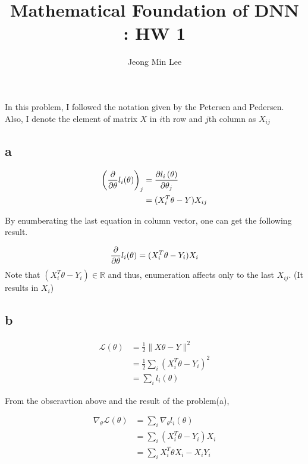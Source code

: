 \documentclass[10pt]{article}
\title{\textbf{Mathematical Foundation of DNN : HW 1}}
\author{Jeong Min Lee}
\begin{document}
\maketitle

\section{}
In this problem, I followed the notation given by the Petersen and Pedersen\cite{Petersen2008}. Also, I denote the element of matrix $X$ in $i$th row and $j$th column as $X_{ij}$
\subsection*{a}
\begin{align} 
    \left({\partial \over \partial \theta} l_i(\theta)\right)_j &= {\partial l_i \left(\theta\right)\over \partial \theta_j} \\
    &= (X_i^T\theta - Y) X_{ij}
\end{align}

By enumberating the last equation in column vector, one can get the following result.

\begin{equation}
    {\partial \over \partial \theta} l_i(\theta) = (X_i^T\theta - Y_i)X_i
\end{equation}
Note that $(X_i^T\theta - Y_i)\in \mathbb{R}$ and thus, enumeration affects only to the last $X_{ij}$. (It results in $X_i$) 

\subsection*{b}
\begin{align}
    \mathcal{L}(\theta) &= \frac{1}{2} \lVert X\theta - Y \rVert^2 \\ &= \frac{1}{2}\sum_i \left(X_i^T\theta - Y_i\right)^2 \\ &= \sum_i l_i(\theta)    
\end{align}

From the obseravtion above and the result of the problem(a),

\begin{align}
    \nabla_\theta \mathcal{L}(\theta) &= \sum_i \nabla_\theta l_i(\theta) \\ &= \sum_i (X_i^T\theta - Y_i)X_i \\ &= \sum_i X_i^T\theta X_i - X_i Y_i
\end{align}
\end{document}
